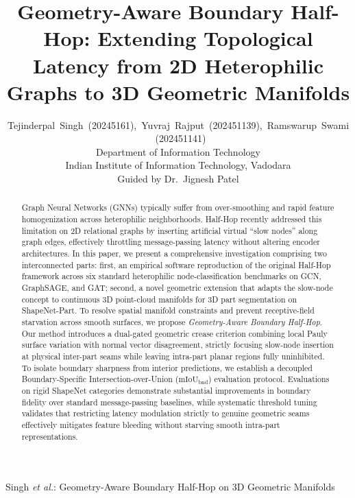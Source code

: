 \documentclass[journal]{IEEEtran}
\begin{document}
\title{Geometry-Aware Boundary Half-Hop: Extending Topological Latency from 2D Heterophilic Graphs to 3D Geometric Manifolds}

\author{Tejinderpal~Singh~(20245161),~Yuvraj~Rajput~(202451139),~Ramswarup~Swami~(202451141)\\
\vspace{0.2em}
{\normalsize Department of Information Technology}\\
{\normalsize Indian Institute of Information Technology, Vadodara}\\
{\normalsize Guided by Dr.\ Jignesh Patel}}

%
{Singh \textit{et al.}: Geometry-Aware Boundary Half-Hop on 3D Geometric Manifolds}

\maketitle

\begin{abstract}
Graph Neural Networks (GNNs) typically suffer from over-smoothing and rapid feature homogenization across heterophilic neighborhoods. Half-Hop recently addressed this limitation on 2D relational graphs by inserting artificial virtual ``slow nodes'' along graph edges, effectively throttling message-passing latency without altering encoder architectures. In this paper, we present a comprehensive investigation comprising two interconnected parts: first, an empirical software reproduction of the original Half-Hop framework across six standard heterophilic node-classification benchmarks on GCN, GraphSAGE, and GAT; second, a novel geometric extension that adapts the slow-node concept to continuous 3D point-cloud manifolds for 3D part segmentation on ShapeNet-Part. To resolve spatial manifold constraints and prevent receptive-field starvation across smooth surfaces, we propose \textit{Geometry-Aware Boundary Half-Hop}. Our method introduces a dual-gated geometric crease criterion combining local Pauly surface variation with normal vector disagreement, strictly focusing slow-node insertion at physical inter-part seams while leaving intra-part planar regions fully uninhibited. To isolate boundary sharpness from interior predictions, we establish a decoupled Boundary-Specific Intersection-over-Union ($\text{mIoU}_{\text{bnd}}$) evaluation protocol. Evaluations on rigid ShapeNet categories demonstrate substantial improvements in boundary fidelity over standard message-passing baselines, while systematic threshold tuning validates that restricting latency modulation strictly to genuine geometric seams effectively mitigates feature bleeding without starving smooth intra-part representations.
\end{abstract}
\end{document}
